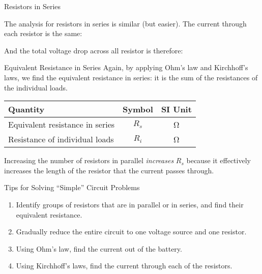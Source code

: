 \documentclass[12pt,aspectratio=169]{beamer}
\begin{document}
\begin{frame}{Resistors in Series}
  \begin{center}
  \end{center}
  The analysis for resistors in series is similar (but easier). The current
  through each resistor is the same:


  And the total voltage drop across all resistor is therefore:

\end{frame}



\begin{frame}{Equivalent Resistance in Series}
  Again, by applying Ohm's law and Kirchhoff's laws, we find the equivalent
  resistance in series: it is the sum of the resistances of the individual
  loads.
  
  \begin{center}
    \begin{tabular}{l|c|c}
      \rowcolor{pink}
      \textbf{Quantity} & \textbf{Symbol} & \textbf{SI Unit} \\ \hline
      Equivalent resistance in series & $R_s$ & \si\ohm \\
      Resistance of individual loads  & $R_i$ & \si\ohm
    \end{tabular}
  \end{center}
  Increasing the number of resistors in parallel \emph{increases} $R_s$
  because it effectively increases the length of the resistor that the current
  passes through.
\end{frame}



\begin{frame}{Tips for Solving ``Simple'' Circuit Problems}
  \begin{enumerate}
  \item Identify groups of resistors that are in parallel or in series, and
    find their equivalent resistance.
  \item Gradually reduce the entire circuit to one voltage source and one
    resistor.
  \item Using Ohm's law, find the current out of the battery.
  \item Using Kirchhoff's laws, find the current through each of the resistors.
  \end{enumerate}
\end{frame}
\end{document}
